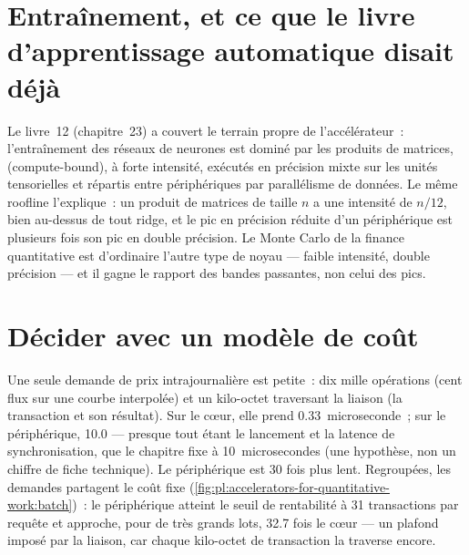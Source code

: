 \section{Entraînement, et ce que le livre d'apprentissage automatique disait déjà}

Le livre~12 (chapitre~23) a couvert le terrain propre de l'accélérateur~: l'entraînement des réseaux de neurones est dominé par les produits de matrices,  (compute-bound), à
forte intensité, exécutés en précision mixte sur les unités tensorielles et répartis entre périphériques par parallélisme de données. Le même roofline l'explique~: un
produit de matrices de taille $n$ a une intensité de $n/12$, bien au-dessus de tout ridge, et le pic en précision réduite d'un périphérique est plusieurs fois son
pic en double précision. Le Monte Carlo de la finance quantitative est d'ordinaire l'autre type de noyau --- faible intensité, double précision --- et
il gagne le rapport des bandes passantes, non celui des pics.

\section{Décider avec un modèle de coût}

Une seule demande de prix intrajournalière est petite~: dix mille opérations (cent flux sur une courbe interpolée) et un kilo-octet traversant la
liaison (la transaction et son résultat). Sur le cœur, elle prend 0.33~microseconde~; sur le périphérique, 10.0 --- presque tout étant le lancement et
la latence de synchronisation, que le chapitre fixe à 10~microsecondes (une hypothèse, non un chiffre de fiche technique). Le périphérique
est 30 fois plus lent. Regroupées, les demandes partagent le coût fixe (\cref{fig:pl:accelerators-for-quantitative-work:batch})~: le périphérique atteint le seuil de rentabilité à 31 transactions par requête
et approche, pour de très grands lots, 32.7 fois le cœur --- un plafond imposé par la liaison, car chaque kilo-octet de transaction la traverse encore.


